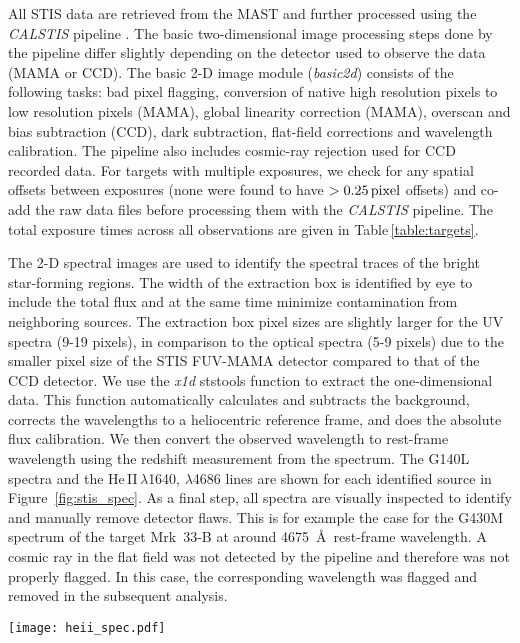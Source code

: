 \documentclass[linenumbers]{aastex63}
\begin{document}
All STIS data are retrieved from the MAST and further processed using the {\it CALSTIS} pipeline \citep[see][]{sohn_stis_2019}. 
The basic two-dimensional image processing steps done by the pipeline differ slightly depending on the detector used to observe the data (MAMA or CCD). The basic 2-D image module (\textit{basic2d}) consists of the following tasks: bad pixel flagging, conversion of native high resolution pixels to low resolution pixels (MAMA), global linearity correction (MAMA), overscan and bias subtraction (CCD), dark subtraction, flat-field corrections and wavelength calibration. 
The pipeline also includes cosmic-ray rejection used for CCD recorded data. 
For targets with multiple exposures, we check for any spatial offsets between exposures (none were found to have $>0.25\,{\rm pixel}$ offsets) and co-add the raw data files before processing them with the {\it CALSTIS} pipeline.
The total exposure times across all observations are given in Table\,\ref{table:targets}. 

The 2-D spectral images are used to identify the spectral traces of the bright star-forming regions. The width of the extraction box is identified by eye to include the total flux and at the same time minimize contamination from neighboring sources. The extraction box pixel sizes are slightly larger for the UV spectra (9-19 pixels), in comparison to the optical spectra (5-9 pixels) due to the smaller pixel size of the STIS FUV-MAMA detector compared to that of the CCD detector. 
We use the {\it x1d} ststools function to extract the one-dimensional data. This function automatically calculates and subtracts the background, corrects the wavelengths to a heliocentric reference frame, and does the absolute flux calibration. We then convert the observed wavelength to rest-frame wavelength using the redshift measurement from the spectrum. 
The G140L spectra and the He\,II\,$\lambda$1640, $\lambda$4686 lines are shown for each identified source in Figure~\ref{fig:stis_spec}.
As a final step, all spectra are visually inspected to identify and manually remove detector flaws. This is for example the case for the G430M spectrum of the target Mrk~33-B at around 4675~\AA\ rest-frame wavelength. A cosmic ray in the flat field was not detected by the pipeline and therefore was not properly flagged. In this case, the corresponding wavelength was flagged and removed in the subsequent analysis.
%
\begin{figure*}[h!]
    \centering
    \texttt{[image: heii\_spec.pdf]}
    \caption{Extracted STIS spectra for the G140L grating and the He\,II\,$\lambda$4686 line in the G430M grating. For each galaxy, we display the spectra of all identified He~II emitters. For multiple spectra we add an offset to distinguish them. We show the continuum fit with blue dashed lines. The data points used for the continuum fit for the G140L grating are marked in red. The wavelength windows for the He\,II\,$\lambda$1640 and $\lambda$4686 lines are marked with a gray background and the lines are highlighted in turquoise. The measured quantities for each spectrum are displayed on the top and also summarized in Table\,\ref{table:ebv}.} 
    \label{fig:stis_spec}
\end{figure*}
%
\end{document}
